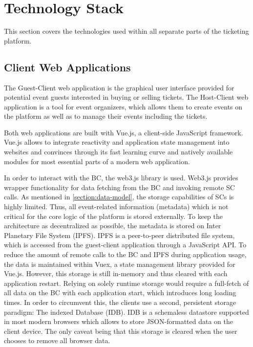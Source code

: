 \section{Technology Stack}\label{chapter:technology}

This section covers the technologies used within all separate parts of the ticketing platform.

\subsection{Client Web Applications}

The Guest-Client web application is the graphical user interface provided for potential event guests interested in buying or selling tickets. The Host-Client web application is a tool for event organizers, which allows them to create events on the platform as well as to manage their events including the tickets.

Both web applications are built with Vue.js, a client-side JavaScript framework. Vue.js allows to integrate reactivity and application state management into websites and convinces through its fast learning curve and natively available modules for most essential parts of a modern web application.

In order to interact with the BC, the web3.js library is used. Web3.js provides wrapper functionality for data fetching from the BC and invoking remote SC calls. 
As mentioned in \ref{section:data-model}, the storage capabilities of SCs is highly limited. Thus, all event-related information (metadata) which is not critical for the core logic of the platform is stored externally. To keep the architecture as decentralized as possible, the metadata is stored on Inter Planetary File System (IPFS). IPFS is a peer-to-peer distributed file system, which is accessed from the guest-client application through a JavaScript API. To reduce the amount of remote calls to the BC and IPFS during application usage, the data is maintained within Vuex, a state management library provided for Vue.js. However, this storage is still in-memory and thus cleared with each application restart. Relying on solely runtime storage would require a full-fetch of all data on the BC with each application start, which introduces long loading times. In order to circumvent this, the clients use a second, persistent storage paradigm: The indexed Database (IDB). IDB is a schemaless datastore supported in most modern browsers which allows to store JSON-formatted data on the client device. The only caveat being that this storage is cleared when the user chooses to remove all browser data.

